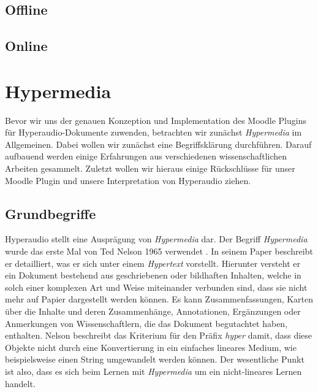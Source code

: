 



\subsection{Offline}
\citep{reinmann1995kooperation}
\citep{reinmann2002analyse}
\citep{pauli2000rolle}

\subsection{Online}

\citep{dillenbourg1999collaborative}


\section{Hypermedia}
Bevor wir uns der genauen Konzeption und Implementation des Moodle Plugins für Hyperaudio-Dokumente zuwenden, betrachten wir zunächst \textit{Hypermedia} im Allgemeinen. Dabei wollen wir zunächst eine Begriffsklärung durchführen. Darauf aufbauend werden einige Erfahrungen aus verschiedenen wissenschaftlichen Arbeiten gesammelt. Zuletzt wollen wir hieraus einige Rückschlüsse für unser Moodle Plugin und unsere Interpretation von Hyperaudio ziehen.


\subsection{Grundbegriffe}
Hyperaudio stellt eine Ausprägung von \textit{Hypermedia} dar. Der Begriff \textit{Hypermedia} wurde das erste Mal von Ted Nelson 1965 verwendet \citep{nelson1965complex}. In seinem Paper beschreibt er detailliert, was er sich unter einem \textit{Hypertext} vorstellt. Hierunter versteht er ein Dokument bestehend aus geschriebenen oder bildhaften Inhalten, welche in solch einer komplexen Art und Weise miteinander verbunden sind, dass sie nicht mehr auf Papier dargestellt werden können. Es kann Zusammenfassungen, Karten über die Inhalte und deren Zusammenhänge, Annotationen, Ergänzungen oder Anmerkungen von Wissenschaftlern, die das Dokument begutachtet haben, enthalten. Nelson beschreibt das Kriterium für den Präfix \textit{hyper} damit, dass diese Objekte nicht durch eine Konvertierung in ein einfaches lineares Medium, wie beispielsweise einen String umgewandelt werden können. Der wesentliche Punkt ist also, dass es sich beim Lernen mit \textit{Hypermedia} um ein nicht-lineares Lernen handelt.

